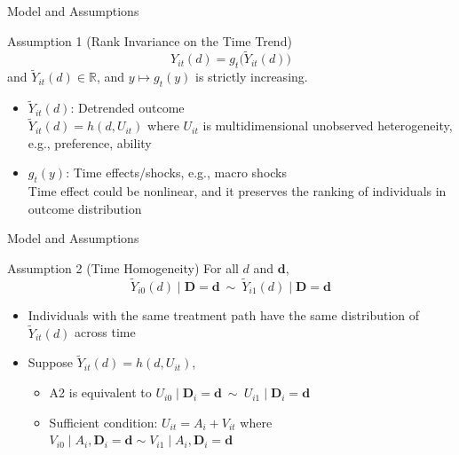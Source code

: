 \documentclass[aspectratio=1610, 9pt]{beamer}
\begin{document}
\begin{frame}{Model and Assumptions}
    \begin{block}{Assumption 1 (Rank Invariance on the Time Trend)}\label{ass:rankinvariance}
        $$Y_{it}(d)=g_{t}\big(\tilde{Y}_{it}(d)\big)$$ and $\tilde{Y}_{it}(d)\in\mathbb{R}$, and $y\mapsto g_{t}(y)$ is strictly increasing.
    \end{block}
    \vspace{0.6cm}
\begin{itemize}
    \item $\tilde{Y}_{it}(d)$: Detrended outcome \\
    $\tilde{Y}_{it}(d)= h(d,U_{it})$ where $U_{it}$ is multidimensional unobserved heterogeneity, e.g., preference, ability
    \item $g_t(y)$: Time effects/shocks, e.g., macro shocks \\ 
    \vspace{0.1cm}
    Time effect could be nonlinear, and it preserves the ranking of individuals in outcome distribution
\end{itemize}

\end{frame}

\begin{frame}{Model and Assumptions}
\begin{block}{Assumption 2 (Time Homogeneity)}\label{ass:stationary}
  For all $d$ and $\mathbf{d}$,
    $$\tilde{Y}_{i0}(d)\mid \mathbf{D}=\mathbf{d} \ \sim \  \tilde{Y}_{i1}(d)\mid \mathbf{D}=\mathbf{d} $$

\end{block}
\vspace{0.5cm}
\begin{itemize}
    \item Individuals with the same treatment path have the same distribution of $\tilde{Y}_{it}(d)$ across time
    \item Suppose $\tilde{Y}_{it}(d)=h(d,U_{it})$,
    \begin{itemize}\setlength{\leftskip}{-1.2em}
        \item[--]  A2 is equivalent to $U_{i0}\mid \mathbf{D}_i=\mathbf{d} \ \sim \ U_{i1}\mid \mathbf{D}_i=\mathbf{d}$ 
        \item[--] Sufficient condition: $U_{it}=A_i+V_{it}$ where $V_{i0}\mid A_i, \mathbf{D}_i=\mathbf{d} \sim V_{i1}\mid A_i, \mathbf{D}_i=\mathbf{d}$
    \end{itemize}

\end{itemize}

\end{frame}
\end{document}
